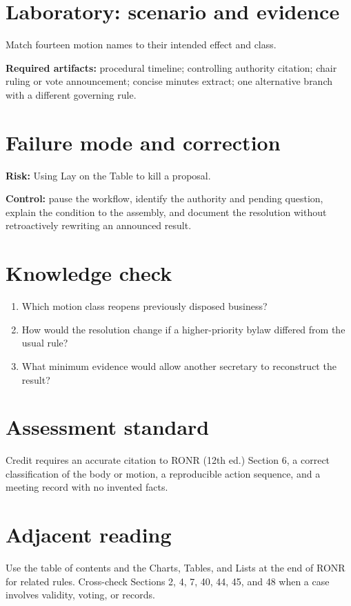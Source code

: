 \documentclass[11pt]{article}
\begin{document}
\section{Laboratory: scenario and evidence}
Match fourteen motion names to their intended effect and class.

\textbf{Required artifacts:} procedural timeline; controlling authority citation; chair ruling or vote announcement; concise minutes extract; one alternative branch with a different governing rule.

\section{Failure mode and correction}
\textbf{Risk:} Using Lay on the Table to kill a proposal.

\textbf{Control:} pause the workflow, identify the authority and pending question, explain the condition to the assembly, and document the resolution without retroactively rewriting an announced result.

\section{Knowledge check}
\begin{enumerate}[leftmargin=*,itemsep=4pt]
\item Which motion class reopens previously disposed business?
\item How would the resolution change if a higher-priority bylaw differed from the usual rule?
\item What minimum evidence would allow another secretary to reconstruct the result?
\end{enumerate}

\section{Assessment standard}
Credit requires an accurate citation to RONR (12th ed.) Section 6, a correct classification of the body or motion, a reproducible action sequence, and a meeting record with no invented facts.

\section{Adjacent reading}
Use the table of contents and the Charts, Tables, and Lists at the end of RONR for related rules. Cross-check Sections 2, 4, 7, 40, 44, 45, and 48 when a case involves validity, voting, or records.
\end{document}
